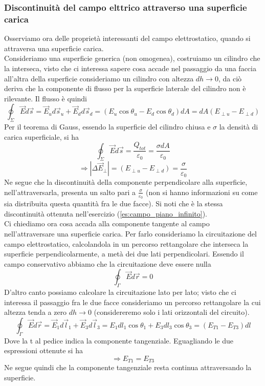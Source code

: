 \documentclass[10pt,a4paper]{article}
\begin{document}
\subsubsection{Discontinuità del campo elttrico attraverso una superficie carica}
Osserviamo ora delle proprietà interessanti del campo elettrostatico, quando si attraversa una superficie carica.\\
Consideriamo una superficie generica (non omogenea), costruiamo un cilindro che la interseca, visto che ci interessa sapere cosa accade nel passaggio da una faccia all'altra della superficie consideriamo un cilindro con altezza \(dh\to 0\), da ciò deriva che la componente di flusso per la superficie laterale del cilindro non è rilevante. Il flusso è quindi
\[\oint_{\Sigma}\vec{E}d\vec{s} = \vec{E}_{u}d\vec{s}_{u}+\vec{E}_{d}d\vec{s}_d=(E_u\cos\theta_u-E_d\cos\theta_d)dA = dA(E_{\perp u}-E_{\perp d})\] 
Per il teorema di Gauss, essendo la superficie del cilindro chiusa e $\sigma$ la densità di carica superficiale, si ha
\[\oint_{\Sigma}\vec{E}d\vec{s} = \frac{Q_{tot}}{\varepsilon_0} = \frac{\sigma dA}{\varepsilon_0}\] 
\[\Rightarrow |\Delta \vec{E}_{\perp}| = (E_{\perp u} - E_{\perp d}) = \frac{\sigma}{\varepsilon_0}\]
Ne segue che la discontinuità della componente perpendicolare alla superficie, nell'attraversarla, presenta un salto pari a \(\frac{\sigma}{\varepsilon_0}\) (non si hanno informazioni su come sia distribuita questa quantità fra le due facce). Si noti che è la stessa discontinuità ottenuta nell'esercizio (\ref{es:campo_piano_infinito}).\\
Ci chiediamo ora cosa accada alla componente tangente al campo nell'attraversare una superficie carica. Per farlo consideriamo la circuitazione del campo elettrostatico, calcolandola in un percorso rettangolare che interseca la superficie perpendicolarmente, a metà dei due lati perpendicolari. Essendo il campo conservativo abbiamo che la circuitazione deve essere nulla
\[\oint_\Gamma\vec{E}d\vec{r} = 0\]
D'altro canto possiamo calcolare la circuitazione lato per lato; visto che ci interessa il passaggio fra le due facce consideriamo un percorso rettangolare la cui altezza tenda a zero \(dh\to 0\) (considereremo solo i lati orizzontali del circuito).  
\[\oint_\Gamma \vec{E}d\vec{r} = \vec{E}_1 d\vec{l}_1 + \vec{E}_3d\vec{l}_3 = E_1dl_1\cos\theta_1 + E_3dl_3\cos\theta_3 = (E_{T1}-E_{T3})dl\]
Dove la t al pedice indica la componente tangenziale. Eguagliando le due espressioni ottenute si ha
\[\Rightarrow E_{T1}=E_{T3}\]
Ne segue quindi che la componente tangenziale resta continua attraversando la superficie. 
\end{document}
